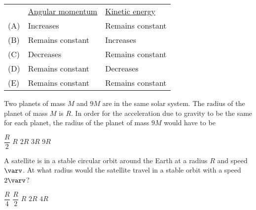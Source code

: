 \documentclass{../../../oss-classkick-exam}
\begin{document}
\begin{multicols*}{2}
\begin{questions}
    \begin{tabular}{lll}
      & \underline{Angular momentum} & \underline{Kinetic energy}\\
      (A) & Increases & Remains constant \\
      (B) & Remains constant & Increases \\
      (C) & Decreases & Remains constant \\
      (D) & Remains constant & Decreases \\
      (E) & Remains constant & Remains constant
    \end{tabular}
    \vspace{.7in}
    
    \question Two planets of mass $M$ and $9M$ are in the same solar system. The
    radius of the planet of mass $M$ is $R$. In order for the acceleration due
    to gravity to be the same for each planet, the radius of the planet of mass
    $9M$ would have to be
    \begin{choices}
      \choice $\dfrac{R}2$
      \choice $R$
      \choice $2R$
      \choice $3R$
      \choice $9R$
    \end{choices}
    
    \question A satellite is in a stable circular orbit around the Earth at a
    radius $R$ and speed $\varv$. At what radius would the satellite travel in
    a stable orbit with a speed $2\varv$?
    \begin{choices}
      \choice $\dfrac{R}4$
      \choice $\dfrac{R}2$
      \choice $R$
      \choice $2R$
      \choice $4R$
    \end{choices}

    

\end{questions}
\end{multicols*}
\end{document}
